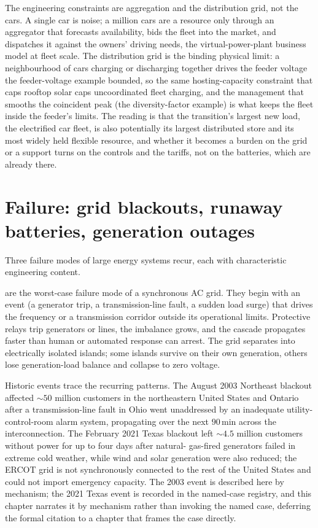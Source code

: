 The engineering constraints are aggregation and the distribution grid, not the
cars. A single car is noise; a million cars are a resource only through an
aggregator that forecasts availability, bids the fleet into the market, and
dispatches it against the owners' driving needs, the virtual-power-plant
business model at fleet scale. The distribution grid is the binding physical
limit: a neighbourhood of cars charging or discharging together drives the
feeder voltage the feeder-voltage example bounded, so the same hosting-capacity
constraint that caps rooftop solar caps uncoordinated fleet charging, and the
management that smooths the coincident peak (the diversity-factor example) is
what keeps the fleet inside the feeder's limits. The reading is that the
transition's largest new load, the electrified car fleet, is also potentially
its largest distributed store and its most widely held flexible resource, and
whether it becomes a burden on the grid or a support turns on the controls and
the tariffs, not on the batteries, which are already there.

\section{Failure: grid blackouts, runaway batteries, generation outages}

Three failure modes of large energy systems recur, each with
characteristic engineering content.

 are the worst-case failure mode of a
synchronous AC grid. They begin with an event (a generator trip, a
transmission-line fault, a sudden load surge) that drives the
frequency or a transmission corridor outside its operational limits.
Protective relays trip generators or lines, the imbalance grows, and
the cascade propagates faster than human or automated response can
arrest. The grid separates into electrically isolated islands; some
islands survive on their own generation, others lose generation-load
balance and collapse to zero voltage.

Historic events trace the recurring patterns. The August 2003
Northeast blackout affected $\sim 50$ million customers in the
northeastern United States and Ontario after a transmission-line
fault in Ohio went unaddressed by an inadequate utility-control-room
alarm system, propagating over the next $90\,\si{\minute}$ across the
interconnection. The February 2021 Texas blackout left $\sim 4.5$
million customers without power for up to four days after natural-
gas-fired generators failed in extreme cold weather, while wind and
solar generation were also reduced; the ERCOT grid is not
synchronously connected to the rest of the United States and could
not import emergency capacity. The 2003 event is described here by
mechanism; the 2021 Texas event is recorded in the named-case registry,
and this chapter narrates it by mechanism rather than invoking the
named case, deferring the formal citation to a chapter that frames the
case directly.


